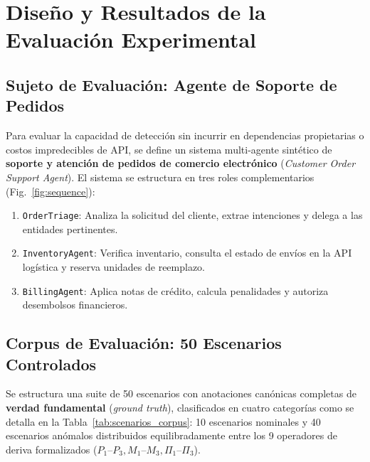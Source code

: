 \documentclass[conference]{IEEEtran}
\begin{document}
\section{Dise\~no y Resultados de la Evaluaci\'on Experimental}

\subsection{Sujeto de Evaluaci\'on: Agente de Soporte de Pedidos}
Para evaluar la capacidad de detecci\'on sin incurrir en dependencias propietarias o costos impredecibles de API, se define un sistema multi-agente sint\'etico de \textbf{soporte y atenci\'on de pedidos de comercio electr\'onico} (\emph{Customer Order Support Agent}). El sistema se estructura en tres roles complementarios (Fig.~\ref{fig:sequence}):
\begin{enumerate}
    \item \texttt{OrderTriage}: Analiza la solicitud del cliente, extrae intenciones y delega a las entidades pertinentes.
    \item \texttt{InventoryAgent}: Verifica inventario, consulta el estado de env\'ios en la API log\'istica y reserva unidades de reemplazo.
    \item \texttt{BillingAgent}: Aplica notas de cr\'edito, calcula penalidades y autoriza desembolsos financieros.
\end{enumerate}

\subsection{Corpus de Evaluaci\'on: 50 Escenarios Controlados}
Se estructura una suite de 50 escenarios con anotaciones can\'onicas completas de \textbf{verdad fundamental} (\emph{ground truth}), clasificados en cuatro categor\'ias como se detalla en la Tabla~\ref{tab:scenarios_corpus}: 10 escenarios nominales y 40 escenarios an\'omalos distribuidos equilibradamente entre los 9 operadores de deriva formalizados ($P_1\text{--}P_3, M_1\text{--}M_3, \Pi_1\text{--}\Pi_3$).
\end{document}
